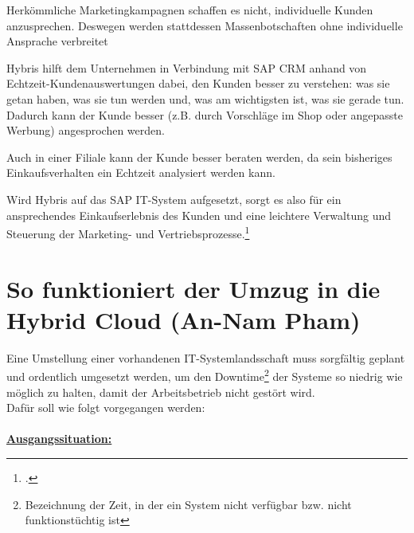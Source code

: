 Herkömmliche Marketingkampagnen schaffen es nicht, individuelle Kunden anzusprechen. Deswegen werden stattdessen Massenbotschaften ohne individuelle Ansprache verbreitet

Hybris hilft dem Unternehmen in Verbindung mit SAP CRM anhand von Echtzeit-Kundenauswertungen dabei, den Kunden besser zu verstehen: was sie getan haben, was sie tun werden und, was am wichtigsten ist, was sie gerade tun. Dadurch kann der Kunde besser (z.B. durch Vorschläge im Shop oder angepasste Werbung) angesprochen werden.

Auch in einer Filiale kann der Kunde besser beraten werden, da sein bisheriges Einkaufsverhalten ein Echtzeit analysiert werden kann.

Wird Hybris auf das SAP IT-System aufgesetzt, sorgt es also für ein ansprechendes Einkaufserlebnis des Kunden und eine leichtere Verwaltung und Steuerung der Marketing- und Vertriebsprozesse.\footcite[vgl.][Online im Internet.]{Hybris}
\newpage

\section{So funktioniert der Umzug in die Hybrid Cloud (An-Nam Pham)}
Eine Umstellung einer vorhandenen IT-Systemlandsschaft muss sorgfältig geplant und ordentlich umgesetzt werden, um den Downtime\footnote{Bezeichnung der Zeit, in der ein System nicht verfügbar bzw. nicht funktionstüchtig ist} der Systeme so niedrig wie möglich zu halten, damit der Arbeitsbetrieb nicht gestört wird.\\
Dafür soll wie folgt vorgegangen werden:\\
\\
\textbf{\underline{Ausgangssituation:}}

